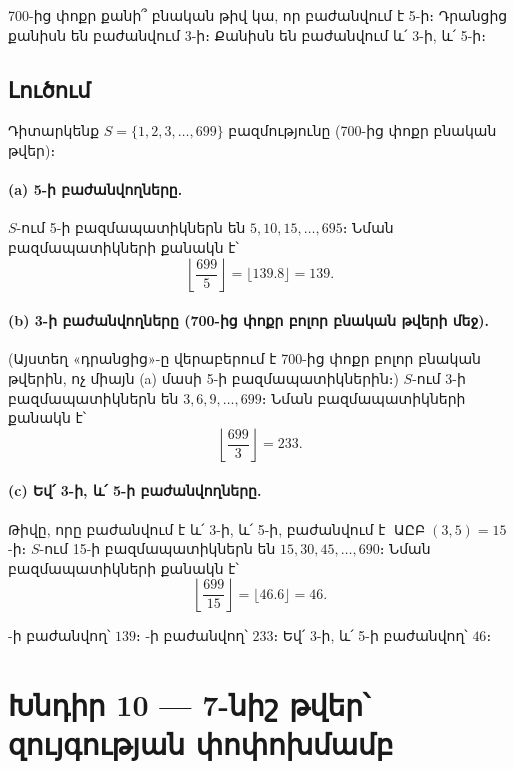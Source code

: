 \documentclass[12pt, a4paper]{article}
\DeclareMathOperator{\armgcd}{ԱԸԲ}
\begin{document}
\begin{problembox}
700-ից փոքր քանի՞ բնական թիվ կա, որ բաժանվում է 5-ի։
Դրանցից քանիսն են բաժանվում 3-ի։
Քանիսն են բաժանվում և՛ 3-ի, և՛ 5-ի։
\end{problembox}

\subsection*{Լուծում}

Դիտարկենք $S = \{1, 2, 3, \ldots, 699\}$ բազմությունը (700-ից փոքր բնական թվեր)։

\paragraph{(a) 5-ի բաժանվողները.}
$S$-ում 5-ի բազմապատիկներն են $5, 10, 15, \ldots, 695$։
Նման բազմապատիկների քանակն է՝
\[
  \left\lfloor \frac{699}{5} \right\rfloor = \lfloor 139.8 \rfloor = 139.
\]

\paragraph{(b) 3-ի բաժանվողները (700-ից փոքր բոլոր բնական թվերի մեջ).}
(Այստեղ «դրանցից»-ը վերաբերում է 700-ից փոքր բոլոր բնական թվերին, ոչ միայն (a) մասի 5-ի բազմապատիկներին։)
$S$-ում 3-ի բազմապատիկներն են $3, 6, 9, \ldots, 699$։
Նման բազմապատիկների քանակն է՝
\[
  \left\lfloor \frac{699}{3} \right\rfloor = 233.
\]

\paragraph{(c) Եվ՛ 3-ի, և՛ 5-ի բաժանվողները.}
Թիվը, որը բաժանվում է և՛ 3-ի, և՛ 5-ի, բաժանվում է $\armgcd(3,5) = 15$-ի։
$S$-ում 15-ի բազմապատիկներն են $15, 30, 45, \ldots, 690$։
Նման բազմապատիկների քանակն է՝
\[
  \left\lfloor \frac{699}{15} \right\rfloor = \lfloor 46.6 \rfloor = 46.
\]

\begin{answerbox}
-ի բաժանվող՝ $\boxed{139}$։ -ի բաժանվող՝ $\boxed{233}$։ \qquad
Եվ՛ 3-ի, և՛ 5-ի բաժանվող՝ $\boxed{46}$։
\end{answerbox}

\newpage
\section{Խնդիր 10 — 7-նիշ թվեր՝ զույգության փոփոխմամբ}
\end{document}
